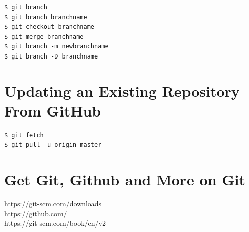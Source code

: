 \begin{shaded}
\begin{verbatim}
$ git branch
$ git branch branchname
$ git checkout branchname
$ git merge branchname
$ git branch -m newbranchname
$ git branch -D branchname
\end{verbatim}
\end{shaded}

\vspace{1cm}

\section{Updating an Existing Repository From GitHub }

\begin{shaded}
\begin{verbatim}
$ git fetch
$ git pull -u origin master
\end{verbatim}
\end{shaded}

\vspace{1cm}

\section{Get Git, Github and More on Git}

https://git-scm.com/downloads  \\
\noindent https://github.com/  \\
\noindent  https://git-scm.com/book/en/v2













